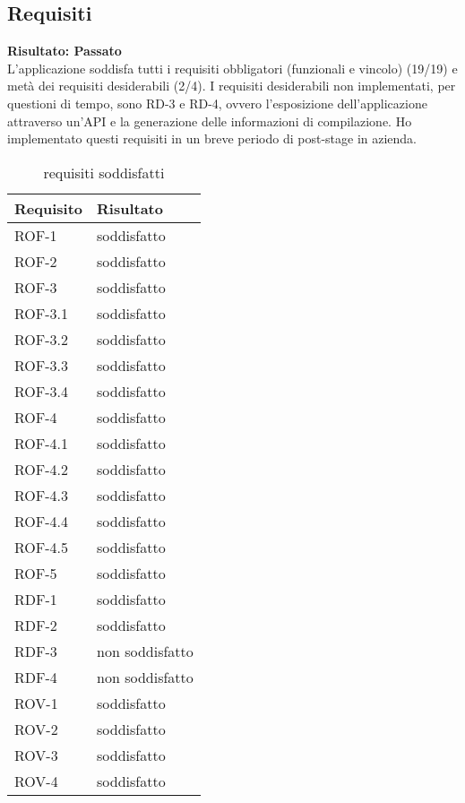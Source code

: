 \subsection{Requisiti} %
\textbf{Risultato: Passato}\\
L'applicazione soddisfa tutti i requisiti obbligatori (funzionali e vincolo) (19/19) e metà dei requisiti desiderabili (2/4). I requisiti desiderabili non implementati, per questioni di tempo, sono RD-3 e RD-4, ovvero l'esposizione dell'applicazione attraverso un'API e la generazione delle informazioni di compilazione. Ho implementato questi requisiti in un breve periodo di post-stage in azienda.
\label{tab:requisiti-resoconto}
\begin{longtable}{|l l|}
\caption{requisiti soddisfatti}\\
\hline
\textbf{Requisito} & \textbf{Risultato} \\
\hline
\endhead
ROF-1     & soddisfatto\\
ROF-2     & soddisfatto\\
ROF-3     & soddisfatto\\
ROF-3.1   & soddisfatto\\
ROF-3.2   & soddisfatto\\
ROF-3.3   & soddisfatto\\
ROF-3.4   & soddisfatto\\
ROF-4     & soddisfatto\\
ROF-4.1   & soddisfatto\\
ROF-4.2   & soddisfatto\\
ROF-4.3   & soddisfatto\\
ROF-4.4   & soddisfatto\\
ROF-4.5   & soddisfatto\\
ROF-5     & soddisfatto\\
RDF-1     & soddisfatto\\
RDF-2     & soddisfatto\\
RDF-3     & non soddisfatto\\
RDF-4     & non soddisfatto\\
ROV-1     & soddisfatto\\
ROV-2     & soddisfatto\\
ROV-3     & soddisfatto\\
ROV-4     & soddisfatto\\
\hline
\end{longtable}

